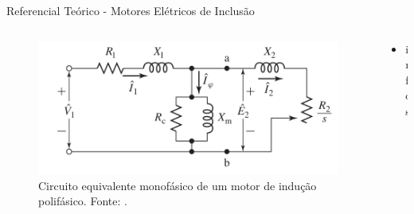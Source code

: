\documentclass[aspectratio=169]{beamer}
\begin{document}
\begin{frame}{Referencial Teórico - Motores Elétricos de Inclusão}
	\begin{columns}
    	\begin{column}{0.50\textwidth}
			\begin{figure}[HT]
				\begin{center}
					\captionsetup{justification=justified}
					\includegraphics[scale=.25]{../referencial/img/circuit_fitzgerald_p354.png}
					\caption{Circuito equivalente monofásico de um motor de indução polifásico. \newline
					Fonte: .} 
					\label{fig:circuit_fitzgerald_p354}
				\end{center}
			\end{figure}
     	\end{column}
		
		\begin{column}{0.5\textwidth}
			\begin{itemize}
				\item infos
			\end{itemize}
	 	\end{column}
	 \end{columns}
\end{frame}

\end{document}
